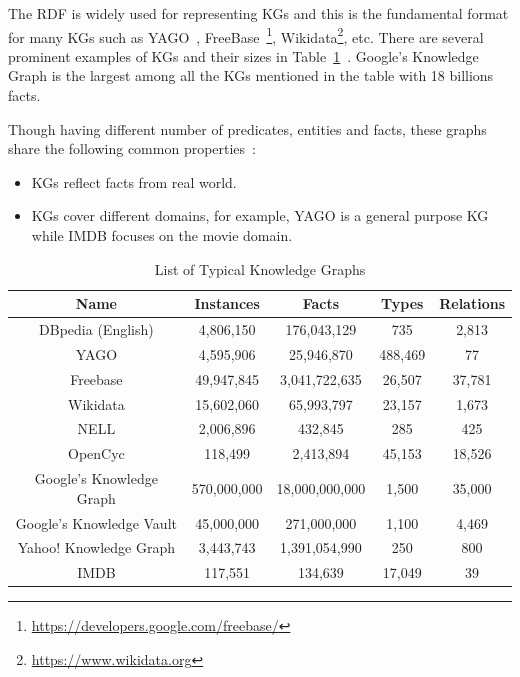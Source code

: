 The RDF is widely used for representing KGs and this is the fundamental format for many KGs such as YAGO~\cite{ref28}, FreeBase~\footnote{\url{https://developers.google.com/freebase/}}, Wikidata\footnote{\url{https://www.wikidata.org}}, etc. There are several prominent examples of KGs and their sizes in Table~\ref{table1}~\cite{ref27}. Google's Knowledge Graph is the largest among all the KGs mentioned in the table with 18 billions facts.

Though having different number of predicates, entities and facts, these graphs share the following common properties~\cite{ref27}:

\begin{itemize}
\item KGs reflect facts from real world.
\item KGs cover different domains, for example, YAGO is a general purpose KG while IMDB focuses on the movie domain.
\end{itemize}

\begin{table}
\begin{center}
\begin{tabular}{|c|c|c|c|c|}
\hline
Name & Instances & Facts & Types & Relations\\
\hline\hline
DBpedia (English) & 4,806,150 & 176,043,129 & 735 & 2,813\\
\hline
YAGO & 4,595,906 & 25,946,870 & 488,469 & 77\\
\hline
Freebase & 49,947,845 & 3,041,722,635 & 26,507 & 37,781\\
\hline
Wikidata & 15,602,060 & 65,993,797 & 23,157 & 1,673\\
\hline
NELL & 2,006,896 & 432,845 & 285 & 425\\
\hline
OpenCyc & 118,499 & 2,413,894 & 45,153 & 18,526\\
\hline
Google's Knowledge Graph & 570,000,000 & 18,000,000,000 & 1,500 & 35,000\\
\hline
Google's Knowledge Vault & 45,000,000 & 271,000,000 & 1,100 & 4,469\\
\hline
Yahoo! Knowledge Graph & 3,443,743 & 1,391,054,990 & 250 & 800\\
\hline
IMDB & 117,551 & 134,639 & 17,049 & 39 \\
\hline
\end{tabular}
\end{center}
\caption{List of Typical Knowledge Graphs}
\label{table1}
\end{table}

